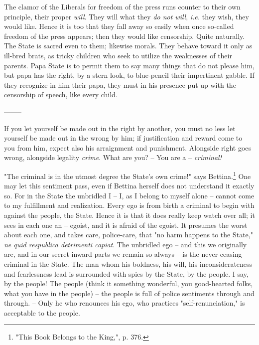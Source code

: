 The clamor of the Liberals for freedom of the press runs counter to their own 
principle, their proper \textit{will}. They will what they \textit{do not 
will}, \textit{i.e.} they wish, they would like. Hence it is too that they 
fall away so easily when once so-called freedom of the press appears; then 
they would like censorship. Quite naturally. The State is sacred even to them; 
likewise morals. They behave toward it only as ill-bred brats, as tricky 
children who seek to utilize the weaknesses of their parents. Papa State is to 
permit them to say many things that do not please him, but papa has the right, 
by a stern look, to blue-pencil their impertinent gabble. If they recognize in 
him their papa, they must in his presence put up with the censorship of 
speech, like every child.

\begin{center}
--------\end{center}


If you let yourself be made out in the right by another, you must no less let 
yourself be made out in the wrong by him; if justification and reward come to 
you from him, expect also his arraignment and punishment. Alongside right goes 
wrong, alongside legality \textit{crime}. What are you? -- You are a -- 
\textit{criminal!}

"{}The criminal is in the utmost degree the State's own crime!"{} says 
Bettina.\footnote{"{}This Book Belongs to the King,"{}, p. 376.} One may let 
this sentiment pass, even if Bettina herself does not understand it exactly 
so. For in the State the unbridled I -- I, as I belong to myself alone -- 
cannot come to my fulfillment and realization. Every ego is from birth a 
criminal to begin with against the people, the State. Hence it is that it does 
really keep watch over all; it sees in each one an -- egoist, and it is afraid 
of the egoist. It presumes the worst about each one, and takes care, 
police-care, that "{}no harm happens to the State,"{} \textit{ne quid 
respublica detrimenti capiat}. The unbridled ego -- and this we originally 
are, and in our secret inward parts we remain so always -- is the 
never-ceasing criminal in the State. The man whom his boldness, his will, his 
inconsiderateness and fearlessness lead is surrounded with spies by the State, 
by the people. I say, by the people! The people (think it something wonderful, 
you good-hearted folks, what you have in the people) -- the people is full of 
police sentiments through and through. -- Only he who renounces his ego, who 
practices "{}self-renunciation,"{} is acceptable to the people.

